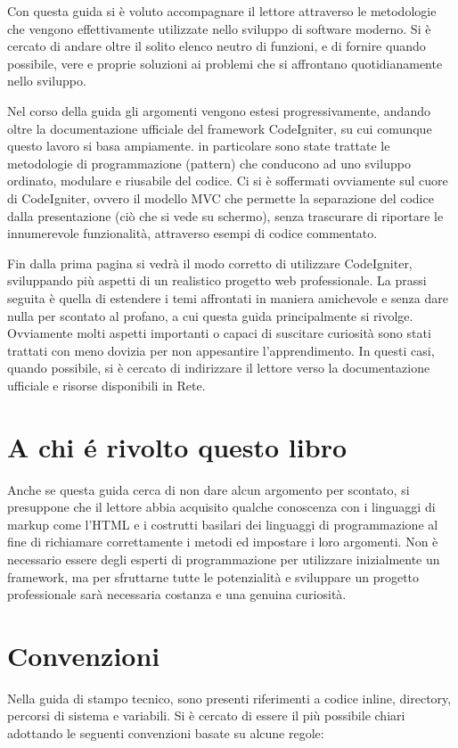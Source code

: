 Con questa guida si è voluto accompagnare il lettore attraverso le metodologie che vengono effettivamente utilizzate nello sviluppo di software moderno. Si è cercato di andare oltre il solito elenco neutro di funzioni, e di fornire quando possibile, vere e proprie soluzioni ai problemi che si affrontano quotidianamente nello sviluppo.

Nel corso della guida gli argomenti vengono estesi progressivamente, andando oltre la documentazione ufficiale del framework CodeIgniter, su cui comunque questo lavoro si basa ampiamente. in particolare sono state trattate le metodologie di programmazione (pattern) che conducono ad uno sviluppo ordinato, modulare e riusabile del codice. Ci si è soffermati ovviamente sul cuore di CodeIgniter, ovvero il modello \ac{MVC} che permette la separazione del codice dalla presentazione (ciò che si vede su schermo), senza trascurare di riportare le innumerevole funzionalità, attraverso esempi di codice commentato.

Fin dalla prima pagina si vedrà il modo corretto di utilizzare CodeIgniter, sviluppando più aspetti di un realistico progetto web professionale. La prassi seguita è quella di estendere i temi affrontati in maniera amichevole e senza dare nulla per scontato al profano, a cui questa guida principalmente si rivolge. Ovviamente molti aspetti importanti o capaci di suscitare curiosità sono stati trattati con meno dovizia per non appesantire l'apprendimento. In questi casi, quando possibile, si è cercato di indirizzare il lettore verso la documentazione ufficiale e risorse disponibili in Rete.

\section*{A chi \'e rivolto questo libro}
Anche se questa guida cerca di non dare alcun argomento per scontato, si presuppone che il lettore abbia acquisito qualche conoscenza con i linguaggi di markup come l'\ac{HTML} e i costrutti basilari dei linguaggi di programmazione al fine di richiamare correttamente i metodi ed impostare i loro argomenti. Non è necessario essere degli esperti di programmazione per utilizzare inizialmente un framework, ma per  sfruttarne tutte le potenzialità e sviluppare un progetto professionale sarà necessaria costanza e una genuina curiosità.

\section*{Convenzioni}
Nella guida di stampo tecnico, sono presenti riferimenti a codice inline, directory, percorsi di sistema e variabili. Si è cercato di essere il più possibile chiari adottando le seguenti convenzioni basate su alcune regole:

